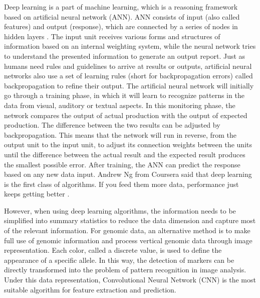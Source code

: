 \documentclass[11pt,a4 paper,title page]{article}
\begin{document}
  Deep learning is a part of machine learning, which is a reasoning framework based on artificial neural network (ANN). ANN consists of input (also called features) and output (response), which are connected by a series of nodes in hidden layers \cite{ agatonovic2000basic}. The input unit receives various forms and structures of information based on an internal weighting system, while the neural network tries to understand the presented information to generate an output report. Just as humans need rules and guidelines to arrive at results or outputs, artificial neural networks also use a set of learning rules (short for backpropagation errors) called backpropagation to refine their output. The artificial neural network will initially go through a training phase, in which it will learn to recognize patterns in the data from visual, auditory or textual aspects. In this monitoring phase, the network compares the output of actual production with the output of expected production. The difference between the two results can be adjusted by backpropagation. This means that the network will run in reverse, from the output unit to the input unit, to adjust its connection weights between the units until the difference between the actual result and the expected result produces the smallest possible error. After training, the ANN can predict the response based on any new data input. Andrew Ng from Coursera said that deep learning is the first class of algorithms. If you feed them more data, performance just keeps getting better \cite{ brownlee2016deep}.
  \hfill\break
  
  However, when using deep learning algorithms, the information needs to be simplified into summary statistics to reduce the data dimension and capture most of the relevant information. For genomic data, an alternative method is to make full use of genomic information and process vertical genomic data through image representation. Each color, called a discrete value, is used to define the appearance of a specific allele. In this way, the detection of markers can be directly transformed into the problem of pattern recognition in image analysis. Under this data representation, Convolutional Neural Network (CNN) is the most suitable algorithm for feature extraction and prediction.
  \hfill\break
  
\end{document}
